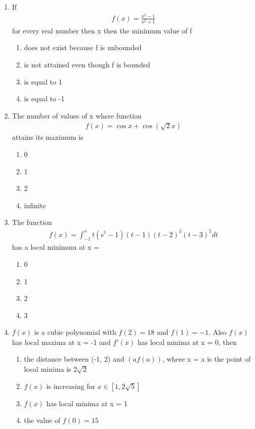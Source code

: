 \begin{enumerate}[label=\arabic*.,ref=\thesubsection.\theenumi]
\item If 
\begin{align*}
f(x) = \frac{x^2 - 1}{x^2 + 1}
\end{align*}
for every real number then x then the minimum value of f
\begin{enumerate}
\item does not exist because f is unbounded 
\item is not attained even though f is bounded 
\item is equal to 1
\item is equal to -1
\end{enumerate}

\item The number of values of x where function 
\begin{align*}
f(x) = \cos x + \cos(\sqrt{2}x)    
\end{align*}
attains its maximum is 
\begin{enumerate}
\item 0
\item 1
\item 2
\item infinite
\end{enumerate}

\item The function 
\begin{align*}
f(x) = \int_{-1}^{x} t(e^t - 1)(t - 1)(t - 2)^{3}(t - 3)^{5}dt
\end{align*}
has a local minimum at x =
\begin{enumerate}
\item 0
\item 1
\item 2
\item 3
\end{enumerate}

\item $f(x)$ is a cubic polynomial with $f(2) = 18$ and $f(1) = -1$. Also $f(x)$ has local maxima at x = -1 and $f'(x)$ has local minima at x = 0, then
\begin{enumerate}
\item the distance between (-1, 2) and $(af(a))$, where x = a is the point of local minima is $2\sqrt{2}$
\item $f(x)$ is increasing for $x \in [1, 2\sqrt{5}]$
\item $f(x)$ has local minima at x = 1
\item the value of $f(0) = 15$
\end{enumerate}


\end{enumerate}
